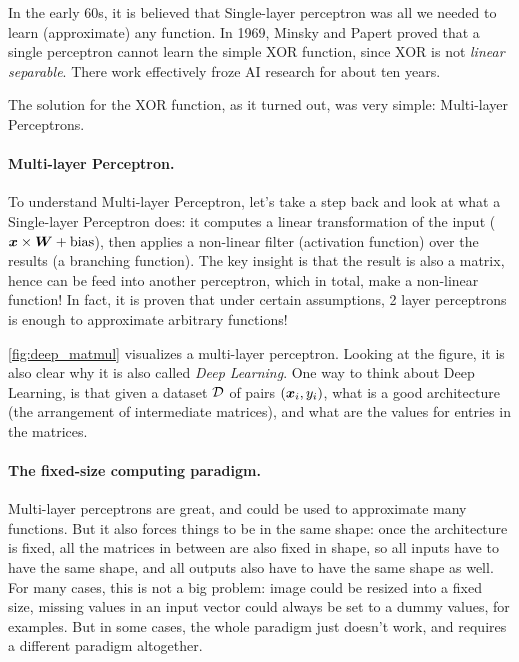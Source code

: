 In the early 60s, it is believed that Single-layer perceptron was all we needed to learn
(approximate) any function. In 1969, Minsky and Papert \cite{perceptrons} proved
that a single perceptron cannot learn the simple XOR function, since XOR is not
\emph{linear separable}. There work effectively froze AI research for about ten years.

The solution for the XOR function, as it turned out, was very simple:
Multi-layer Perceptrons.

\paragraph{Multi-layer Perceptron.} To understand Multi-layer Perceptron, let's
take a step back and look at what a Single-layer Perceptron does: it computes a linear
transformation of the input ($\boldsymbol{x} \times \boldsymbol{W} + \text{bias}$), then
applies a non-linear filter (activation function) over the results (a branching function). The key
insight is that the result is also a matrix, hence can be feed into another
perceptron, which in total, make a non-linear function! In fact, it is proven \cite{universal}
that under certain assumptions, 2 layer perceptrons is enough to approximate arbitrary
functions!

\cref{fig:deep_matmul} visualizes a multi-layer perceptron. Looking at the
figure, it is also clear why it is also called \emph{Deep Learning}. One way to
think about Deep Learning, is that given a dataset $\mathcal{D}$ of pairs $(\boldsymbol{x}_i, y_i)$, what
is a good architecture (the arrangement of intermediate matrices), and what are
the values for entries in the matrices.

\paragraph{The fixed-size computing paradigm.} Multi-layer perceptrons are
great, and could be used to approximate many functions. But it also forces
things to be in the same shape: once the architecture is fixed, all the matrices
in between are also fixed in shape, so all inputs have to have the same shape,
and all outputs also have to have the same shape as well. For many cases, this
is not a big problem: image could be resized into a fixed size, missing
values in an input vector could always be set to a dummy values, for examples.
But in some cases, the whole paradigm just doesn't work, and requires a
different paradigm altogether. 


